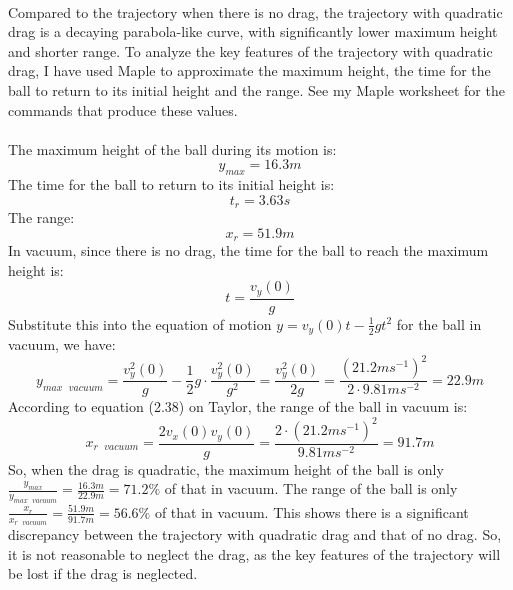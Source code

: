 \documentclass{article}
\begin{document}
\begin{enumerate}
\begin{figure}[ht]
      \label{fig:label}
  \end{figure}\\
  Compared to the trajectory when there is no drag, the trajectory with quadratic drag is a decaying parabola-like curve, with significantly lower maximum height and shorter range. To analyze the key features of the trajectory with quadratic drag,
  I have used Maple to approximate the maximum height, the time for the ball to return to its initial height and the range. See my Maple worksheet for the commands that produce these values.\\
  \\
  The maximum height of the ball during its motion is:
  \begin{equation}
    y_{max} = 16.3 m
  \end{equation}
  The time for the ball to return to its initial height is:
  \begin{equation}
    t_r = 3.63 s
  \end{equation}
  The range:
  \begin{equation}
    x_r = 51.9 m
  \end{equation}
  In vacuum, since there is no drag, the time for the ball to reach the maximum height is:
  \begin{equation}
    t = \frac{v_y(0)}{g}
  \end{equation}
  Substitute this into the equation of motion \(y = v_y(0)t -\frac{1}{2}gt^2\) for the ball in vacuum, we have:
  \begin{equation}
    y_{max\text{ }vacuum} = \frac{v_y^2(0)}{g} - \frac{1}{2}g\cdot  \frac{v_y^2(0)}{g^2} =\frac{v_y^2(0)}{2g} = \frac{(21.2ms^{-1})^2}{2\cdot 9.81ms^{-2}} = 22.9 m
  \end{equation}
  According to equation (2.38) on Taylor\cite{Taylor2005}, the range of the ball in vacuum is:
  \begin{equation}
    x_{r\text{ }vacuum} = \frac{2v_{x}(0)v_y(0)}{g} = \frac{2\cdot (21.2ms^{-1})^2}{9.81ms^{-2}} = 91.7 m
  \end{equation}
  So, when the drag is quadratic, the maximum height of the ball is only \(\frac{y_{max}}{y_{max\text{ }vacuum}}=\frac{16.3m}{22.9m}= 71.2\%\) of that in vacuum. The range of the ball is only \(\frac{x_r}{x_{r\text{ }vacuum}} = \frac{51.9m}{91.7m}=56.6\%\) of that in vacuum. This shows there is a significant discrepancy between the trajectory with quadratic drag and that of no drag. So, it is not reasonable to neglect the drag, as the key features of the trajectory will be lost if the drag is neglected.

\end{enumerate}
\end{document}

